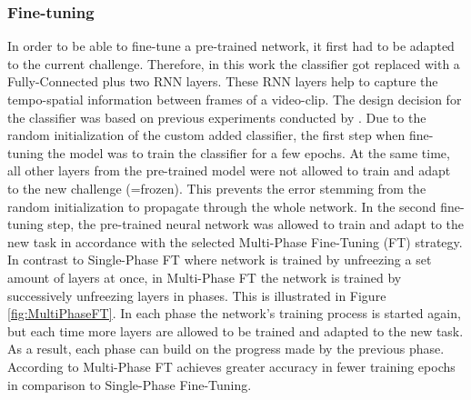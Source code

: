 \subsubsection{Fine-tuning}
In order to be able to fine-tune a pre-trained network, it first had to be adapted to the current challenge. Therefore, in this work the classifier got replaced with a Fully-Connected plus two RNN layers. These RNN layers help to capture the tempo-spatial information between frames of a video-clip. The design decision for the classifier was based on previous experiments conducted by \citet{Kollias:2019:AffWild}.
\newline\newline
Due to the random initialization of the custom added classifier, the first step when fine-tuning the model was to train the classifier for a few epochs. At the same time, all other layers from the pre-trained model were not allowed to train and adapt to the new challenge (=frozen). This prevents the error stemming from the random initialization to propagate through the whole network.\citep{Chollet:2017:DeepLearningPython}
\newline\newline
In the second fine-tuning step, the pre-trained neural network was allowed to train and adapt to the new task in accordance with the selected Multi-Phase Fine-Tuning (FT) \citep{Sarhan:2020:MultiPhaseFineTuning} strategy. In contrast to Single-Phase FT where network is trained by unfreezing a set amount of layers at once, in Multi-Phase FT the network is trained by successively unfreezing layers in phases. This is illustrated in Figure \ref{fig:MultiPhaseFT}. In each phase the network's training process is started again, but each time more layers are allowed to be trained and adapted to the new task. As a result, each phase can build on the progress made by the previous phase. According to \citet{Sarhan:2020:MultiPhaseFineTuning} Multi-Phase FT achieves greater accuracy in fewer training epochs in comparison to Single-Phase Fine-Tuning.

